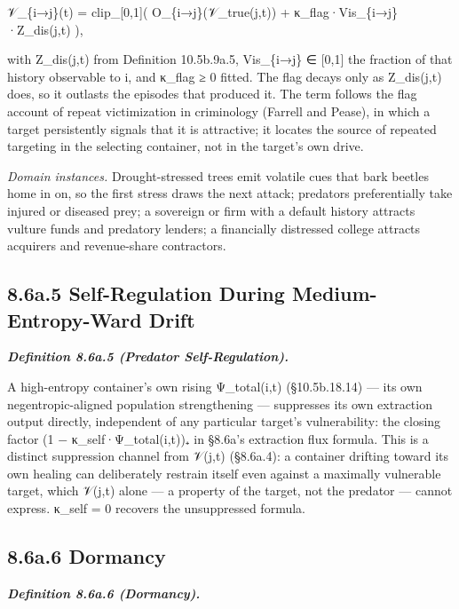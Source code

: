 \documentclass[
]{article}
\begin{document}
𝒱\_\{i→j\}(t) = clip\_{[}0,1{]}( O\_\{i→j\}(𝒱\_true(j,t)) +
κ\_flag·Vis\_\{i→j\}·Z\_dis(j,t) ),

with Z\_dis(j,t) from Definition 10.5b.9a.5, Vis\_\{i→j\} ∈ {[}0,1{]}
the fraction of that history observable to i, and κ\_flag ≥ 0 fitted.
The flag decays only as Z\_dis(j,t) does, so it outlasts the episodes
that produced it. The term follows the flag account of repeat
victimization in criminology (Farrell and Pease), in which a target
persistently signals that it is attractive; it locates the source of
repeated targeting in the selecting container, not in the target's own
drive.

\emph{Domain instances.} Drought-stressed trees emit volatile cues that
bark beetles home in on, so the first stress draws the next attack;
predators preferentially take injured or diseased prey; a sovereign or
firm with a default history attracts vulture funds and predatory
lenders; a financially distressed college attracts acquirers and
revenue-share contractors.

\hypertarget{a.5-self-regulation-during-medium-entropy-ward-drift}{%
\subsection{8.6a.5 Self-Regulation During Medium-Entropy-Ward
Drift}\label{a.5-self-regulation-during-medium-entropy-ward-drift}}

\emph{\textbf{Definition 8.6a.5 (Predator Self-Regulation).}}

A high-entropy container's own rising Ψ\_total(i,t) (§10.5b.18.14) ---
its own negentropic-aligned population strengthening --- suppresses its
own extraction output directly, independent of any particular target's
vulnerability: the closing factor (1 − κ\_self·Ψ\_total(i,t))₊ in
§8.6a's extraction flux formula. This is a distinct suppression channel
from 𝒱(j,t) (§8.6a.4): a container drifting toward its own healing can
deliberately restrain itself even against a maximally vulnerable target,
which 𝒱(j,t) alone --- a property of the target, not the predator ---
cannot express. κ\_self = 0 recovers the unsuppressed formula.

\hypertarget{a.6-dormancy}{%
\subsection{8.6a.6 Dormancy}\label{a.6-dormancy}}

\emph{\textbf{Definition 8.6a.6 (Dormancy).}}
\end{document}
